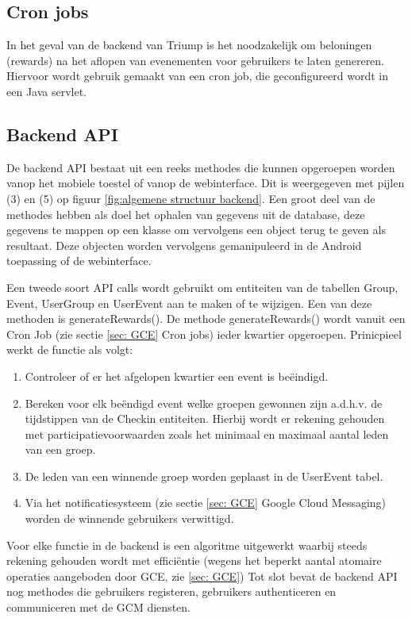 \subsection{Cron jobs}
In het geval van de backend van Triump is het noodzakelijk om beloningen (rewards) na het aflopen van evenementen voor gebruikers te laten genereren. Hiervoor wordt gebruik gemaakt van een cron job, die geconfigureerd wordt in een Java servlet. 

\subsection{Backend API}
\label{backend API}
De backend API bestaat uit een reeks methodes die kunnen opgeroepen worden vanop het mobiele toestel of vanop de webinterface. Dit is weergegeven met pijlen (3) en (5) op figuur \ref{fig:algemene structuur backend}. Een groot deel van de methodes hebben als doel het ophalen van gegevens uit de database, deze gegevens te mappen op een klasse om vervolgens een object terug te geven als resultaat. Deze objecten worden vervolgens gemanipuleerd in de Android toepassing of de webinterface.

Een tweede soort API calls wordt gebruikt om entiteiten van de tabellen Group, Event, UserGroup en UserEvent aan te maken of te wijzigen. Een van deze methoden is generateRewards(). De methode generateRewards() wordt vanuit een Cron Job (zie sectie \ref{sec: GCE} Cron jobs) ieder kwartier opgeroepen. Prinicpieel werkt de functie als volgt:
\begin{enumerate}
	\item Controleer of er het afgelopen kwartier een event is beëindigd.
	\item Bereken voor elk beëndigd event welke groepen gewonnen zijn a.d.h.v. de tijdstippen van de Checkin entiteiten. Hierbij wordt er rekening gehouden met participatievoorwaarden zoals het minimaal en maximaal aantal leden van een groep.
	\item De leden van een winnende groep worden geplaast in de UserEvent tabel.
	\item Via het notificatiesysteem (zie sectie \ref{sec: GCE} Google Cloud Messaging) worden de winnende gebruikers verwittigd.
\end{enumerate}
Voor elke functie in de backend is een algoritme uitgewerkt waarbij steeds rekening gehouden wordt met efficiëntie (wegens het beperkt aantal atomaire operaties aangeboden door GCE, zie \ref{sec: GCE})
Tot slot bevat de backend API nog methodes die gebruikers registeren, gebruikers authenticeren en communiceren met de GCM diensten. 

